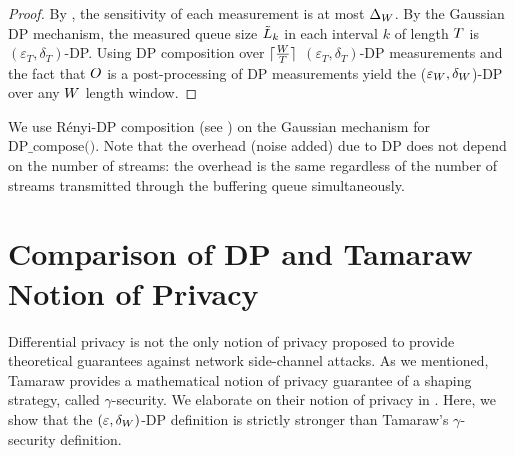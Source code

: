 \begin{proof}
    By , the sensitivity of each measurement is at most $\Delta_{W}$.
    By the Gaussian DP mechanism, the measured queue size $\tilde{L}_{k}$ in each interval $k$ of length $T$ is $(\varepsilon_{T}, \delta_{T})$-DP.
    Using DP composition over $\lceil \frac{W}{T} \rceil$ $(\varepsilon_{T}, \delta_{T})$-DP measurements and the fact that $O$ is a post-processing of DP measurements yield the ($\varepsilon_{W}, \delta_{W}$)-DP over any $W$ length window.
\end{proof}
We use R\'enyi-DP composition (see ) on the Gaussian mechanism for $\textrm{DP\_compose()}$.
Note that the overhead (\ie noise added) due to DP does not depend on the number of streams: the overhead is the same regardless of the number of streams transmitted through the buffering queue simultaneously.

\section{Comparison of DP and Tamaraw Notion of Privacy}
Differential privacy is not the only notion of privacy proposed to provide theoretical guarantees against network side-channel attacks.
As we mentioned, Tamaraw \cite{cai2014tamaraw} provides a
mathematical notion of privacy guarantee of a shaping strategy, called $\gamma$-security. 
We elaborate on their notion of privacy in .
Here, we show that the $(\varepsilon, \delta_{W})$-DP definition is strictly stronger than Tamaraw's $\gamma$-security definition.

